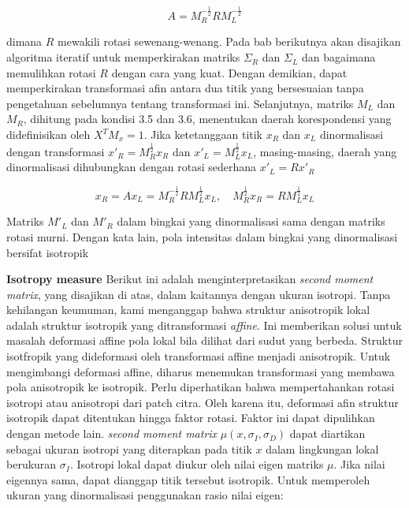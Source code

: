 \begin{equation*}
  A = M_{R}^{-\frac{1}{2}}R M_{L}^{-\frac{1}{2}}
\end{equation*}

dimana \(R\) mewakili rotasi sewenang-wenang. Pada bab berikutnya akan disajikan algoritma iteratif untuk memperkirakan matriks \(\Sigma_{R}\) dan \(\Sigma_{L}\) dan 
bagaimana memulihkan rotasi \(R\) dengan cara yang kuat. Dengan demikian, dapat memperkirakan transformasi afin antara dua titik yang bersesuaian 
tanpa pengetahuan sebelumnya tentang transformasi ini. Selanjutnya, matriks \(M_{L}\) dan \(M_{R}\), dihitung pada kondisi 3.5 dan 3.6, menentukan daerah korespondensi 
yang didefinisikan oleh \(X^{T}M_{x}=1\). Jika ketetanggaan titik \(x_{R}\) dan \(x_{L}\) dinormalisasi dengan transformasi \(x'_{R}=M^{\frac{1}{2}}_{R}x_{R}\) dan \(x'_{L}=M^{\frac{1}{2}}_{L}x_{L}\), masing-masing, 
daerah yang dinormalisasi dihubungkan dengan rotasi sederhana \(x'_{L}=Rx'_{R}\)

\begin{equation}
  x_{R} = A x_{L} = M_{R}^{-\frac{1}{2}}R M_{L}^{\frac{1}{2}} x_{L}, \quad M_{R}^{\frac{1}{2}}x_{R} = R M_{L}^{\frac{1}{2}} x_{L}
\end{equation}

Matriks \(M'_{L}\) dan \(M'_{R}\) dalam bingkai yang dinormalisasi sama dengan matriks rotasi murni. Dengan kata lain, pola intensitas dalam bingkai yang dinormalisasi bersifat isotropik

\textbf{Isotropy measure} Berikut ini adalah menginterpretasikan \emph{second moment matrix}, yang disajikan 
di atas, dalam kaitannya dengan ukuran isotropi. Tanpa kehilangan keumuman, kami menganggap bahwa struktur 
anisotropik lokal adalah struktur isotropik yang ditransformasi \emph{affine}. Ini memberikan solusi untuk 
masalah deformasi affine pola lokal bila dilihat dari sudut yang berbeda. Struktur isotfropik yang 
dideformasi oleh transformasi affine menjadi anisotropik. Untuk mengimbangi deformasi affine, 
diharus menemukan transformasi yang membawa pola anisotropik ke isotropik. 
Perlu diperhatikan bahwa mempertahankan rotasi isotropi atau anisotropi dari patch citra.
Oleh karena itu, deformasi afin struktur isotropik dapat ditentukan hingga faktor rotasi. 
Faktor ini dapat dipulihkan dengan metode lain. \emph{second moment matrix} \(\mu(x,\sigma_{I},\sigma_{D})\)
dapat diartikan sebagai ukuran isotropi yang diterapkan pada titik \(x\) dalam lingkungan lokal berukuran \(\sigma_{I}\). 
Isotropi lokal dapat diukur oleh nilai eigen matriks \(\mu\). Jika nilai eigennya sama, dapat dianggap titik tersebut isotropik. 
Untuk memperoleh ukuran yang dinormalisasi penggunakan rasio nilai eigen:

